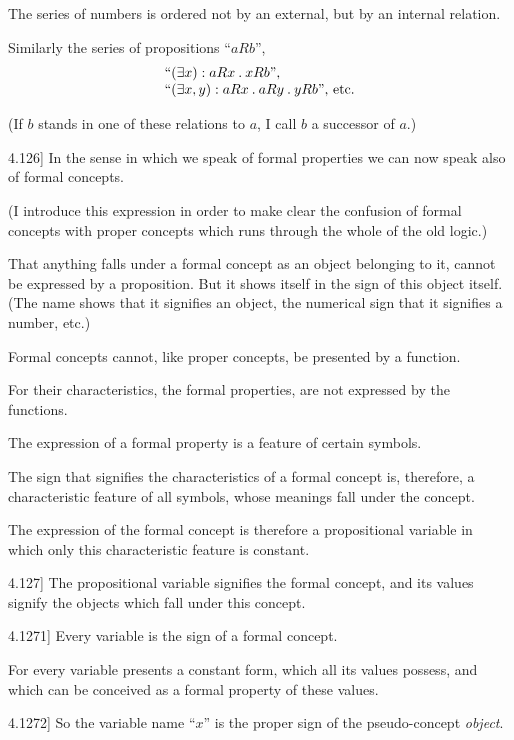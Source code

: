 \documentclass[12pt,oneside]{book}[2007/10/19]
\newcommand{\PropositionE}[2]{%
  \item[\phantomsection\label{PropE:#1}\PropGRef{#1}] #2%
}
\newcommand{\PropGRef}[1]{\hyperref[PropG:#1]{#1}}
\newcommand{\DotOp}{\mathbin{.}}
\begin{document}
\begin{propositions}
{The series of numbers is ordered not by an
external, but by an internal relation.

Similarly the series of propositions ``$aRb$'',
\[
\begin{array}{l}
``(\exists x) : aRx \DotOp xRb\text{'',}\\
``(\exists x,y) : aRx \DotOp aRy \DotOp yRb\text{'', etc.}
\end{array}
\]

(If $b$ stands in one of these relations to $a$, I call
$b$ a successor of $a$.)}


\PropositionE{4.126}
{In the sense in which we speak of formal
properties we can now speak also of formal
concepts.

(I introduce this expression in order to make
clear the confusion of formal concepts with proper
concepts which runs through the whole of the old
logic.)

That anything falls under a formal concept as
an object belonging to it, cannot be expressed by
a proposition. But it shows itself in the sign of
this object itself. (The name shows that it signifies
an object, the numerical sign that it signifies a
number, etc.)

Formal concepts cannot, like proper concepts,
be presented by a function.

For their characteristics, the formal properties,
are not expressed by the functions.

The expression of a formal property is a feature
of certain symbols.

The sign that signifies the characteristics of a
formal concept is, therefore, a characteristic feature
of all symbols, whose meanings fall under the
concept.

The expression of the formal concept is therefore
a propositional variable in which only this
characteristic feature is constant.}


\PropositionE{4.127}
{The propositional variable signifies the formal
concept, and its values signify the objects which
fall under this concept.}


\PropositionE{4.1271}
{Every variable is the sign of a formal
concept.

For every variable presents a constant form,
which all its values possess, and which can
be conceived as a formal property of these
values.}


\PropositionE{4.1272}
{So the variable name ``$x$'' is the proper sign of
the pseudo-concept \emph{object}.

}
\end{propositions}
\end{document}
